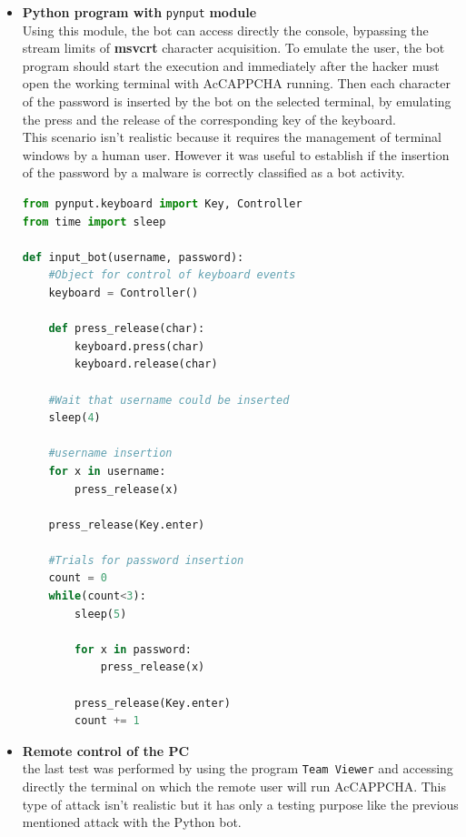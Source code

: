 \begin{itemize}
{\begin{lstlisting}[language=python, showstringspaces=false, tabsize=4, basicstyle=\footnotesize, caption={\footnotesize{Bot using popen.}},label={Results:popen_bot}]
    #Wait until username could be inserted
    sleep(4)
    #Write username and password
    credentials = username.encode() + b'\r\n' + \
    			  password.encode() + b'\r\n'
    output = process.communicate(credentials)[0]
    
    print(output.decode())
\end{lstlisting}
}
\item{\textbf{Python program with} \texttt{pynput} \textbf{module}\\
Using this module, the bot can access directly the console, bypassing the stream limits of \textbf{msvcrt} character acquisition. To emulate the user, the bot program should start the execution and immediately after the hacker must open the working terminal with AcCAPPCHA running. Then each character of the password is inserted by the bot on the selected terminal, by emulating the press and the release of the corresponding key of the keyboard.\\
This scenario isn't realistic because it requires the management of terminal windows by a human user. However it was useful to establish if the insertion of the password by a malware is correctly classified as a bot activity.
\begin{lstlisting}[language=python, showstringspaces=false, tabsize=4, basicstyle=\footnotesize, caption={\footnotesize{Bot using pynput module.}},label={Results:pynput_bot}]
from pynput.keyboard import Key, Controller
from time import sleep

def input_bot(username, password):
    #Object for control of keyboard events
    keyboard = Controller()

    def press_release(char):
        keyboard.press(char)
        keyboard.release(char)

    #Wait that username could be inserted
    sleep(4)

    #username insertion
    for x in username:
        press_release(x)
    
    press_release(Key.enter)

    #Trials for password insertion
    count = 0
    while(count<3):
        sleep(5)
        
        for x in password:
            press_release(x)

        press_release(Key.enter)
        count += 1
\end{lstlisting}
}
\item{\textbf{Remote control of the PC}\\
the last test was performed by using the program \texttt{Team Viewer} and accessing directly the terminal on which the remote user will run AcCAPPCHA. This type of attack isn't realistic but it has only a testing purpose like the previous mentioned attack with the Python bot.}
\end{itemize}
